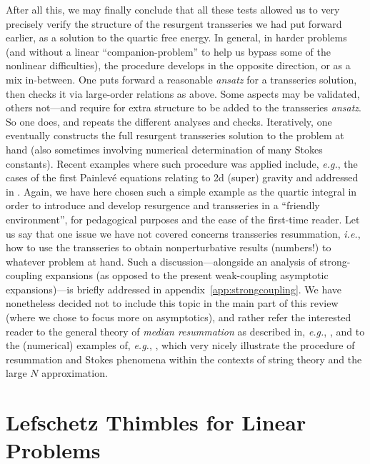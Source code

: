 \documentclass[11pt,a4paper]{article}
\begin{document}
After all this, we may finally conclude that all these tests allowed us to very precisely verify the structure of the resurgent transseries we had put forward earlier, as a solution to the quartic free energy. In general, in harder problems (and without a linear ``companion-problem'' to help us bypass some of the nonlinear difficulties), the procedure develops in the opposite direction, or as a mix in-between. One puts forward a reasonable \textit{ansatz} for a transseries solution, then checks it via large-order relations as above. Some aspects may be validated, others not---and require for extra structure to be added to the transseries \textit{ansatz}. So one does, and repeats the different analyses and checks. Iteratively, one eventually constructs the full resurgent transseries solution to the problem at hand (also sometimes involving numerical determination of many Stokes constants). Recent examples where such procedure was applied include, \textit{e.g.}, the cases of the first Painlev\'e equations relating to 2d (super) gravity and addressed in \cite{msw07, m08, msw08, gikm10, asv11, sv13, asv18a}. Again, we have here chosen such a simple example as the quartic integral in order to introduce and develop resurgence and transseries in a ``friendly environment'', for pedagogical purposes and the ease of the first-time reader. Let us say that one issue we have not covered concerns transseries resummation, \textit{i.e.}, how to use the transseries to obtain nonperturbative results (numbers!) to whatever problem at hand. Such a discussion---alongside an analysis of strong-coupling expansions (as opposed to the present weak-coupling asymptotic expansions)---is briefly addressed in appendix~\ref{app:strongcoupling}. We have nonetheless decided not to include this topic in the main part of this review (where we chose to focus more on asymptotics), and rather refer the interested reader to the general theory of \textit{median resummation} as described in, \textit{e.g.}, \cite{as13}, and to the (numerical) examples of, \textit{e.g.}, \cite{m08, gmz14, csv15, a15, cms16, cms17, c1712}, which very nicely illustrate the procedure of resummation and Stokes phenomena within the contexts of string theory and the large $N$ approximation.


\section{Lefschetz Thimbles for Linear Problems}\label{sec:lefschetz}
\end{document}
